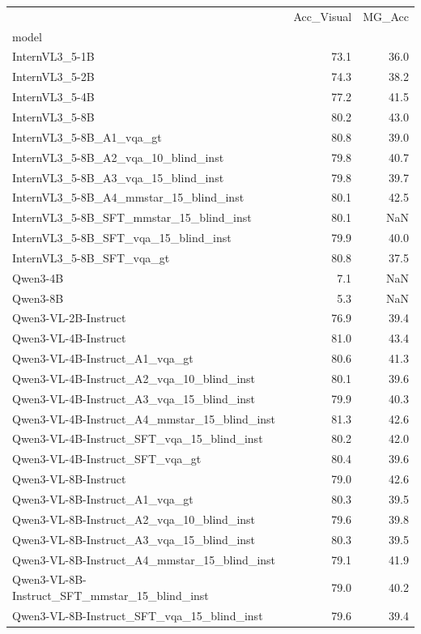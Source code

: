 \begin{tabular}{lrr}
\toprule
 & Acc_Visual & MG_Acc \\
model &  &  \\
\midrule
InternVL3_5-1B & 73.1 & 36.0 \\
InternVL3_5-2B & 74.3 & 38.2 \\
InternVL3_5-4B & 77.2 & 41.5 \\
InternVL3_5-8B & 80.2 & 43.0 \\
InternVL3_5-8B_A1_vqa_gt & 80.8 & 39.0 \\
InternVL3_5-8B_A2_vqa_10_blind_inst & 79.8 & 40.7 \\
InternVL3_5-8B_A3_vqa_15_blind_inst & 79.8 & 39.7 \\
InternVL3_5-8B_A4_mmstar_15_blind_inst & 80.1 & 42.5 \\
InternVL3_5-8B_SFT_mmstar_15_blind_inst & 80.1 & NaN \\
InternVL3_5-8B_SFT_vqa_15_blind_inst & 79.9 & 40.0 \\
InternVL3_5-8B_SFT_vqa_gt & 80.8 & 37.5 \\
Qwen3-4B & 7.1 & NaN \\
Qwen3-8B & 5.3 & NaN \\
Qwen3-VL-2B-Instruct & 76.9 & 39.4 \\
Qwen3-VL-4B-Instruct & 81.0 & 43.4 \\
Qwen3-VL-4B-Instruct_A1_vqa_gt & 80.6 & 41.3 \\
Qwen3-VL-4B-Instruct_A2_vqa_10_blind_inst & 80.1 & 39.6 \\
Qwen3-VL-4B-Instruct_A3_vqa_15_blind_inst & 79.9 & 40.3 \\
Qwen3-VL-4B-Instruct_A4_mmstar_15_blind_inst & 81.3 & 42.6 \\
Qwen3-VL-4B-Instruct_SFT_vqa_15_blind_inst & 80.2 & 42.0 \\
Qwen3-VL-4B-Instruct_SFT_vqa_gt & 80.4 & 39.6 \\
Qwen3-VL-8B-Instruct & 79.0 & 42.6 \\
Qwen3-VL-8B-Instruct_A1_vqa_gt & 80.3 & 39.5 \\
Qwen3-VL-8B-Instruct_A2_vqa_10_blind_inst & 79.6 & 39.8 \\
Qwen3-VL-8B-Instruct_A3_vqa_15_blind_inst & 80.3 & 39.5 \\
Qwen3-VL-8B-Instruct_A4_mmstar_15_blind_inst & 79.1 & 41.9 \\
Qwen3-VL-8B-Instruct_SFT_mmstar_15_blind_inst & 79.0 & 40.2 \\
Qwen3-VL-8B-Instruct_SFT_vqa_15_blind_inst & 79.6 & 39.4 \\

\end{tabular}
